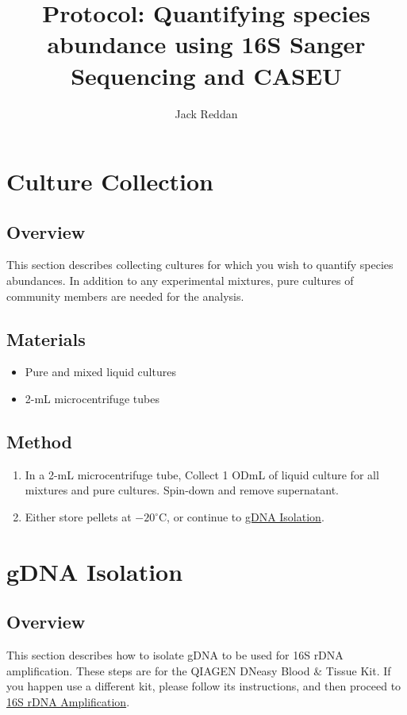 \documentclass[twocolumn]{article}
\begin{document}
\title{Protocol: Quantifying species abundance using 16S Sanger Sequencing and CASEU}
\author{Jack Reddan}

\maketitle{}

\tableofcontents{}

\section{Culture Collection}\label{CC}
\subsection{Overview}
This section describes collecting cultures for which you wish to quantify species abundances.
In addition to any experimental mixtures,
pure cultures of community members are needed for the analysis.

\subsection{Materials}
\begin{itemize}
  \item Pure and mixed liquid cultures
  \item 2-mL microcentrifuge tubes
\end{itemize}

\subsection{Method}
\begin{enumerate}
  \item In a 2-mL microcentrifuge tube, Collect 1 ODmL of liquid culture for all mixtures and pure cultures. Spin-down and remove supernatant.
  \item Either store pellets at $-20^\circ$C, or continue to \hyperref[GI]{gDNA Isolation}.
\end{enumerate}

\section{gDNA Isolation}\label{GI}
\subsection{Overview}
This section describes how to isolate gDNA to be used for 16S rDNA amplification.
These steps are for the QIAGEN DNeasy Blood \& Tissue Kit.
If you happen use a different kit,
please follow its instructions,
and then proceed to \hyperref[1rA]{16S rDNA Amplification}.
\end{document}
